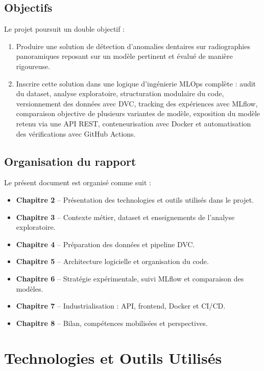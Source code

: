 \documentclass[a4paper,12pt]{report}
\begin{document}
\section{Objectifs}
Le projet poursuit un double objectif :
\begin{enumerate}
\item Produire une solution de d\'etection d'anomalies dentaires sur radiographies panoramiques reposant sur un mod\`ele pertinent et \'evalu\'e de mani\`ere rigoureuse.
\item Inscrire cette solution dans une logique d'ing\'enierie MLOps compl\`ete : audit du dataset, analyse exploratoire, structuration modulaire du code, versionnement des donn\'ees avec DVC, tracking des exp\'eriences avec MLflow, comparaison objective de plusieurs variantes de mod\`ele, exposition du mod\`ele retenu via une API REST, conteneurisation avec Docker et automatisation des v\'erifications avec GitHub Actions.
\end{enumerate}

\section{Organisation du rapport}
Le pr\'esent document est organis\'e comme suit :
\begin{itemize}
\item \textbf{Chapitre 2} -- Pr\'esentation des technologies et outils utilis\'es dans le projet.
\item \textbf{Chapitre 3} -- Contexte m\'etier, dataset et enseignements de l'analyse exploratoire.
\item \textbf{Chapitre 4} -- Pr\'eparation des donn\'ees et pipeline DVC.
\item \textbf{Chapitre 5} -- Architecture logicielle et organisation du code.
\item \textbf{Chapitre 6} -- Strat\'egie exp\'erimentale, suivi MLflow et comparaison des mod\`eles.
\item \textbf{Chapitre 7} -- Industrialisation : API, frontend, Docker et CI/CD.
\item \textbf{Chapitre 8} -- Bilan, comp\'etences mobilis\'ees et perspectives.
\end{itemize}


\chapter{Technologies et Outils Utilis\'es}
\end{document}
